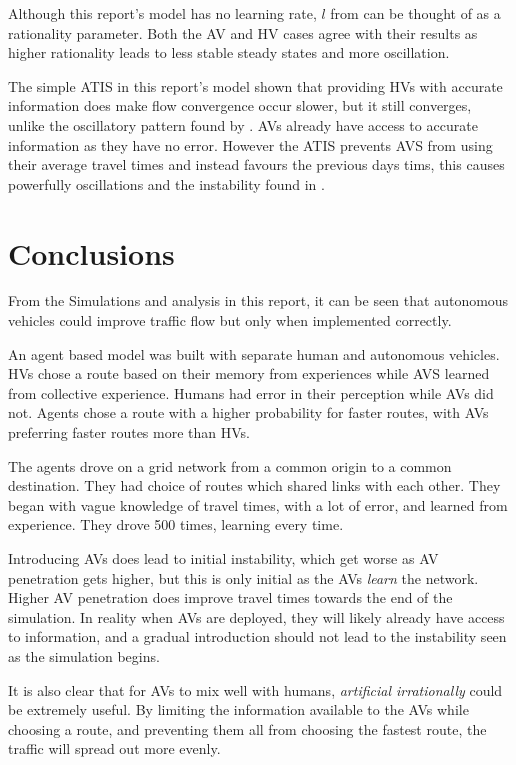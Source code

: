 \documentclass[12pt, a4paper, onecolumn]{article}
\begin{document}
Although this report's model has no learning rate, $l$ from \cite{Wei2014} can be thought of as a rationality parameter. Both the AV and HV cases agree with their results as higher rationality leads to less stable steady states and more oscillation. 

The simple ATIS in this report's model shown that providing HVs with accurate information does make flow convergence occur slower, but it still converges, unlike the oscillatory pattern found by \cite{Liu2007}. AVs already have access to accurate information as they have no error. However the ATIS prevents AVS from using their average travel times and instead favours the previous days tims, this causes powerfully oscillations and the instability found in \cite{Liu2007}.


\section{Conclusions}
From the Simulations and analysis in this report, it can be seen that autonomous vehicles could improve traffic flow but only when implemented correctly.

An agent based model was built with separate human and autonomous vehicles. HVs chose a route based on their memory from experiences while AVS learned from collective experience. Humans had error in their perception while AVs did not. Agents chose a route with a higher probability for faster routes, with AVs preferring faster routes more than HVs. 

The agents drove on a grid network from a common origin to a common destination. They had choice of routes which shared links with each other. They began with vague knowledge of travel times, with a lot of error, and learned from experience. They drove 500 times, learning every time.

Introducing AVs does lead to initial instability, which get worse as AV penetration gets higher, but this is only initial as the AVs \textit{learn} the network. Higher AV penetration does improve travel times towards the end of the simulation. In reality when AVs are deployed, they will likely already have access to information, and a gradual introduction should not lead to the instability seen as the simulation begins. 

It is also clear that for AVs to mix well with humans, \textit{artificial irrationally} could be extremely useful. By limiting the information available to the AVs while choosing a route, and preventing them all from choosing the fastest route, the traffic will spread out more evenly. 
\end{document}
